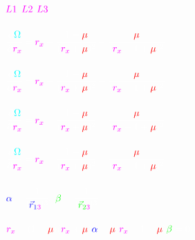 \documentclass{article}
\newcommand{\cw}{\color{white}}
\newcommand{\cm}{\color{mag}}
\newcommand{\cred}{\color{red}}
\newcommand{\cb}{\color{blue}}
\newcommand{\cg}{\color{green}}
\begin{document}
$\color{mag}L1$
$\color{mag}L2$
$\color{mag}L3$\\\\



$
\color{white}\cfrac{\partial\color{cyan}\Omega}{\partial \color{mag}r_x}=
\color{mag}r_x\color{white}-
\cfrac{1-\color{red}\mu\color{white}}
{(\color{mag}r_x\color{white}+\color{red}\mu\color{white})^2}
\color{white}-
\cfrac{\color{red}\mu\color{white}}
{(\color{mag}r_x\color{white}-1+\color{red}\mu\color{white})^2}
$\\\\

$
\color{white}\cfrac{\partial\color{cyan}\Omega}{\partial \color{mag}r_x}=
\color{mag}r_x\color{white}-
\cfrac{1-\color{red}\mu\color{white}}
{(\color{mag}r_x\color{white}+\color{red}\mu\color{white})^2}
\color{white}+
\cfrac{\color{red}\mu\color{white}}
{(\color{mag}r_x\color{white}-1+\color{red}\mu\color{white})^2}
$\\\\

$
\color{white}\cfrac{\partial\color{cyan}\Omega}{\partial \color{mag}r_x}=
\color{mag}r_x\color{white}+
\cfrac{1-\color{red}\mu\color{white}}
{(\color{mag}r_x\color{white}+\color{red}\mu\color{white})^2}
\color{white}+
\cfrac{\color{red}\mu\color{white}}
{(\color{mag}r_x\color{white}-1+\color{red}\mu\color{white})^2}
$\\\\

$
\color{white}\cfrac{\partial\color{cyan}\Omega}{\partial \color{mag}r_x}=
\color{mag}r_x\color{white}+
\cfrac{1-\color{red}\mu\color{white}}
{(\color{mag}r_x\color{white}+\color{red}\mu\color{white})^2}
\color{white}-
\cfrac{\color{red}\mu\color{white}}
{(\color{mag}r_x\color{white}-1+\color{red}\mu\color{white})^2}
$\\\\


$
\cb\alpha\cw=\cfrac{1}{|\cb\vec{r}_{1\cm3}\cw|^3}\cw,\;
\cg\beta\cw=\cfrac{1}{|\cg\vec{r}_{2\cm3}\cw|^3}
$\\\\

$
\cm r_x\cw-(1-\cred\mu\cw)(\cm r_x\cw+\cred\mu\cw)\cb\alpha\cw-
\cred\mu\cw(\cm r_x\cw-1+\cred\mu\cw)\cg\beta\cw=0
$
\end{document}
